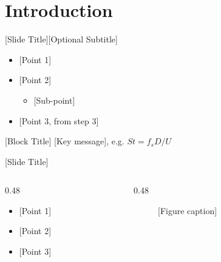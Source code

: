 \section{Introduction}

\begin{frame}{[Slide Title]}{[Optional Subtitle]}
  \begin{itemize}
    \item {[Point 1]} \cite{placeholder_article}
    \pause                                  %
    \item {[Point 2]} \cite{placeholder_conference,placeholder_book}
      \begin{itemize}
        \item {[Sub-point]}
      \end{itemize}
    \item<3-> {[Point 3, from step 3]}
  \end{itemize}

  \begin{block}{[Block Title]}
    [Key message], e.g. \( St = f_s D / U \)
  \end{block}

\end{frame}

\begin{frame}{[Slide Title]}
  \begin{columns}[T]
    \begin{column}{0.48\textwidth}
      \begin{itemize}
        \item {[Point 1]}
        \item {[Point 2]}
        \item {[Point 3]}
      \end{itemize}
    \end{column}
    \begin{column}{0.48\textwidth}
      \begin{figure}
        \FigurePlaceholder{4.2cm}{[Figure]}   %
        \caption{[Figure caption]}\label{fig:example}
      \end{figure}
    \end{column}
  \end{columns}
\end{frame}
